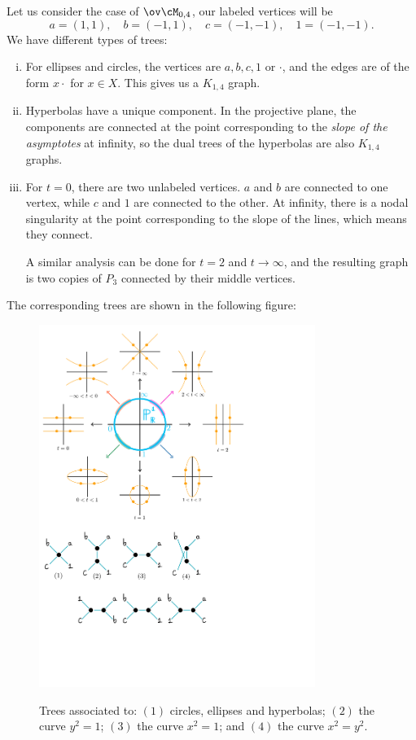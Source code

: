 \documentclass[12pt]{memoir}
\begin{document}
\begin{Ex}
Let us consider the case of $\ov\cM_{0,4}$, our labeled vertices will be 
$$a=(1,1),\quad b=(-1,1),\quad c=(-1,-1),\quad 1=(-1,-1).$$
We have different types of trees:
\begin{enumerate}[i)]
    \item For ellipses and circles, the vertices are ${a,b,c,1}$ or ${\cdot}$, and the edges are of the form $x\cdot$ for $x\in X$. This gives us a $K_{1,4}$ graph.
    \item Hyperbolas have a unique component. In the projective plane, the components are connected at the point corresponding to the \emph{slope of the asymptotes} at infinity, so the dual trees of the hyperbolas are also $K_{1,4}$ graphs.
    \item For $t=0$, there are two unlabeled vertices. $a$ and $b$ are connected to one vertex, while $c$ and $1$ are connected to the other. At infinity, there is a nodal singularity at the point corresponding to the slope of the lines, which means they connect.\par 
    A similar analysis can be done for $t=2$ and $t\to\infty$, and the resulting graph is two copies of $P_3$ connected by their middle vertices.
\end{enumerate}
The corresponding trees are shown in the following figure: 
\begin{figure}[h!]
    \centering
    \includegraphics[width=0.8\textwidth, trim= 0.4cm 8.3cm 9cm 16cm,clip]{fig2.pdf}
    \label{fig3}
    \caption{Trees associated to: $(1)$ circles, ellipses and hyperbolas; $(2)$ the curve $y^2=1$; $(3)$ the curve $x^2=1$; and $(4)$ the curve $x^2=y^2$.}
\end{figure}
\end{Ex}
\end{document}
